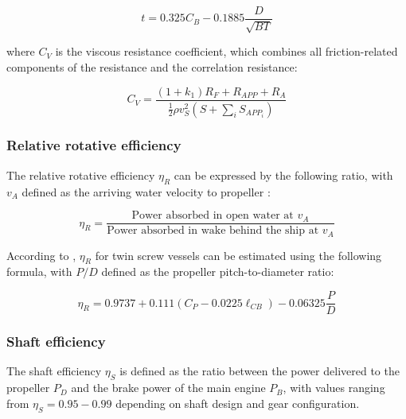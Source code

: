 \begin{equation}
    \label{eqn:thrust_t}
    t = 0.325 C_B - 0.1885 \frac{D}{\sqrt{BT}}
\end{equation}

where $C_V$ is the viscous resistance coefficient, which combines all friction-related components of the resistance and the correlation resistance:

\begin{equation}
    \label{eqn:C_V}
    C_V = \frac{(1+k_1)R_F+R_{APP}+R_A}{\frac{1}{2}\rho v_S^2 (S+\sum_i S_{APP_i})}
\end{equation}

\subsubsection*{Relative rotative efficiency}

The relative rotative efficiency \begin{math} \eta_R \end{math} can be expressed by the following ratio, with $v_A$ defined as the arriving water velocity to propeller :

\begin{equation}
    \label{eqn: n_rot_MAN}
    \eta_R = \frac{\text{Power absorbed in open water at }v_A}{\text{Power absorbed in wake behind the ship at }v_A}
\end{equation}

According to , $\eta_R$ for twin screw vessels can be estimated using the following formula, with $P/D$ defined as the propeller pitch-to-diameter ratio:

\begin{equation}
    \label{eqn: eta_rot_holtrop}
    \eta_R = 0.9737 + 0.111(C_P-0.0225\ell_{CB}) - 0.06325\frac{P}{D}
\end{equation}

\subsubsection*{Shaft efficiency}

The shaft efficiency \begin{math}\eta_S\end{math} is defined as the ratio between the power delivered to the propeller $P_D$ and the brake power of the main engine $P_B$, with values ranging from $\eta_S = 0.95 - 0.99$ depending on shaft design and gear configuration.


